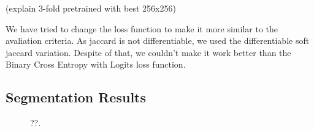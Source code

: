 \documentclass[conference]{IEEEtran}
\begin{document}
(explain 3-fold pretrained with best 256x256)

We have tried to change the loss function to make it more similar to the avaliation criteria. As jaccard is not differentiable, we used the differentiable soft jaccard variation. Despite of that, we couldn't make it work better than the Binary Cross Entropy with Logits loss function. 

\subsection{Segmentation Results}

\begin{figure}
\centering
{}\hfil
{}
\caption{??.}\label{result_samples}
\end{figure}
\end{document}

